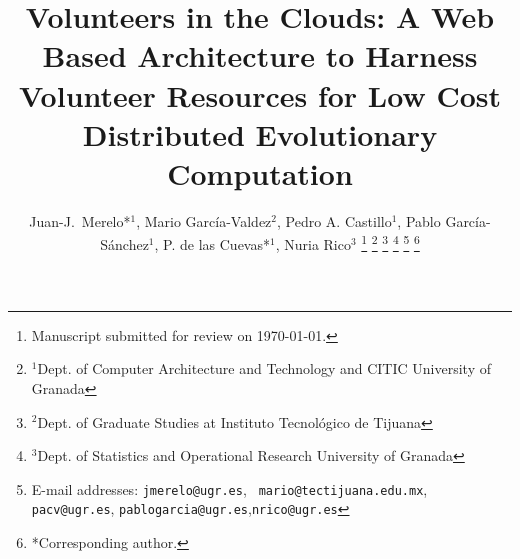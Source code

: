 \documentclass[journal,onecolumn]{IEEEtran}
\begin{document}
\title{Volunteers in the Clouds: A Web Based Architecture to Harness Volunteer Resources 
for Low Cost Distributed Evolutionary Computation }



\author{Juan-J.~Merelo*$^1$, Mario Garc\'ia-Valdez$^2$, Pedro A. Castillo$^1$, Pablo Garc\'ia-S\'anchez$^1$, P. de las Cuevas*$^1$, Nuria Rico$^3$
\thanks{Manuscript submitted for review on \today.}%
\thanks{$^1$Dept. of Computer Architecture and Technology and CITIC University of Granada}%
\thanks{$^2$Dept. of Graduate Studies at Instituto Tecnol\'ogico de Tijuana}%
\thanks{$^3$Dept. of Statistics and Operational Research University of Granada}%
\thanks{E-mail addresses: {\tt jmerelo@ugr.es}, {\tt
    mario@tectijuana.edu.mx}, {\tt pacv@ugr.es}, {\tt pablogarcia@ugr.es},{\tt nrico@ugr.es}}%
\thanks{*Corresponding author.}%
}

\maketitle
\end{document}

